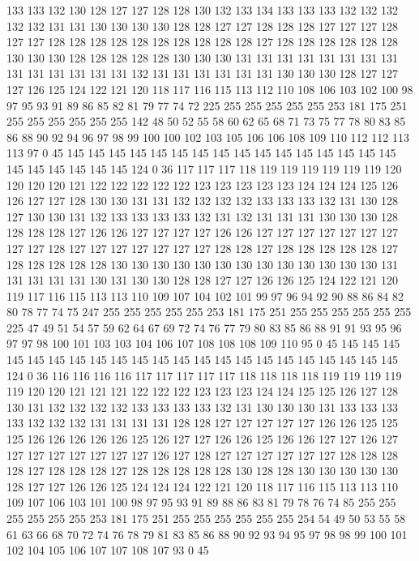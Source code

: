 133 133 132 130 128 127 127 128 128 130 132 133 134 133 133 133 132 132 132 132
132 131 131 130 130 130 130 128 128 127 127 128 128 128 127 127 127 128 127 127
128 128 128 128 128 128 128 128 128 128 127 128 128 128 128 128 128 130 130 130
128 128 128 128 128 130 130 130 131 131 131 131 131 131 131 131 131 131 131 131
131 131 132 131 131 131 131 131 131 130 130 130 128 127 127 127 126 125 124 122
121 120 118 117 116 115 113 112 110 108 106 103 102 100 98 97 95 93 91 89
86 85 82 81 79 77 74 72 225 255 255 255 255 255 253 181 175 251 255 255
255 255 255 255 142 48 50 52 55 58 60 62 65 68 71 73 75 77 78 80
83 85 86 88 90 92 94 96 97 98 99 100 100 102 103 105 106 106 108 109
110 112 112 113 113 97 0 45 145 145 145 145 145 145 145 145 145 145 145 145
145 145 145 145 145 145 145 145 145 145 124 0 36 117 117 117 118 119 119 119
119 119 119 120 120 120 120 121 122 122 122 122 122 123 123 123 123 123 124 124
124 125 126 126 127 127 128 130 130 131 131 132 132 132 132 133 133 133 132 131
130 128 127 130 130 131 132 133 133 133 133 132 131 132 131 131 131 130 130 130
128 128 128 128 127 126 126 127 127 127 127 126 126 127 127 127 127 127 127 127
127 127 128 127 127 127 127 127 127 127 128 128 127 128 128 128 128 128 127 128
128 128 128 128 130 130 130 130 130 130 130 130 130 130 130 130 130 131 131 131
131 131 130 131 130 130 128 128 127 127 126 126 125 124 122 121 120 119 117 116
115 113 113 110 109 107 104 102 101 99 97 96 94 92 90 88 86 84 82 80
78 77 74 75 247 255 255 255 255 255 253 181 175 251 255 255 255 255 255 255
225 47 49 51 54 57 59 62 64 67 69 72 74 76 77 79 80 83 85 86
88 91 91 93 95 96 97 97 98 100 101 103 103 104 106 107 108 108 108 109
110 95 0 45 145 145 145 145 145 145 145 145 145 145 145 145 145 145 145 145
145 145 145 145 145 145 124 0 36 116 116 116 116 117 117 117 117 117 118 118
118 118 119 119 119 119 119 120 120 121 121 121 122 122 122 123 123 123 124 124
125 125 126 127 128 130 131 132 132 132 132 133 133 133 133 132 131 130 130 130
131 133 133 133 133 132 132 132 131 131 131 131 128 128 127 127 127 127 127 126
126 125 125 125 126 126 126 126 126 125 126 127 127 126 126 125 126 126 127 127
126 127 127 127 127 127 127 127 127 126 127 128 127 127 127 127 127 127 128 128
128 128 127 128 128 128 127 128 128 128 128 128 130 128 128 130 130 130 130 130
128 127 127 126 126 125 124 124 124 122 121 120 118 117 116 115 113 113 110 109
107 106 103 101 100 98 97 95 93 91 89 88 86 83 81 79 78 76 74 85
255 255 255 255 255 255 253 181 175 251 255 255 255 255 255 255 254 54 49 50
53 55 58 61 63 66 68 70 72 74 76 78 79 81 83 85 86 88 90 92
93 94 95 97 98 98 99 100 101 102 104 105 106 107 107 108 107 93 0 45
